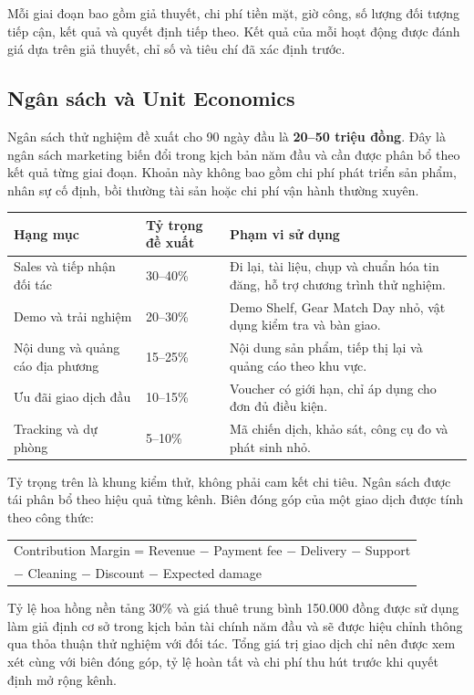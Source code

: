 Mỗi giai đoạn bao gồm giả thuyết, chi phí tiền mặt, giờ công, số lượng đối tượng tiếp cận, kết quả và quyết định tiếp theo. Kết quả của mỗi hoạt động được đánh giá dựa trên giả thuyết, chỉ số và tiêu chí đã xác định trước.

\subsection{Ngân sách và Unit Economics}

Ngân sách thử nghiệm đề xuất cho 90 ngày đầu là \textbf{20--50 triệu đồng}. Đây là ngân sách marketing biến đổi trong kịch bản năm đầu và cần được phân bổ theo kết quả từng giai đoạn. Khoản này không bao gồm chi phí phát triển sản phẩm, nhân sự cố định, bồi thường tài sản hoặc chi phí vận hành thường xuyên.

\begin{longtable}{@{}p{}p{}p{}@{}}
\toprule
\textbf{Hạng mục} & \textbf{Tỷ trọng đề xuất} & \textbf{Phạm vi sử dụng} \\
\midrule
\endhead
Sales và tiếp nhận đối tác & 30--40\% & Đi lại, tài liệu, chụp và chuẩn hóa tin đăng, hỗ trợ chương trình thử nghiệm. \\
Demo và trải nghiệm & 20--30\% & Demo Shelf, Gear Match Day nhỏ, vật dụng kiểm tra và bàn giao. \\
Nội dung và quảng cáo địa phương & 15--25\% & Nội dung sản phẩm, tiếp thị lại và quảng cáo theo khu vực. \\
Ưu đãi giao dịch đầu & 10--15\% & Voucher có giới hạn, chỉ áp dụng cho đơn đủ điều kiện. \\
Tracking và dự phòng & 5--10\% & Mã chiến dịch, khảo sát, công cụ đo và phát sinh nhỏ. \\
\bottomrule
\end{longtable}

Tỷ trọng trên là khung kiểm thử, không phải cam kết chi tiêu. Ngân sách được tái phân bổ theo hiệu quả từng kênh. Biên đóng góp của một giao dịch được tính theo công thức:

\begin{center}
\small
\begin{tabular}{l}
Contribution Margin = Revenue $-$ Payment fee $-$ Delivery $-$ Support \\
$-$ Cleaning $-$ Discount $-$ Expected damage
\end{tabular}
\end{center}

Tỷ lệ hoa hồng nền tảng 30\% và giá thuê trung bình 150.000 đồng được sử dụng làm giả định cơ sở trong kịch bản tài chính năm đầu và sẽ được hiệu chỉnh thông qua thỏa thuận thử nghiệm với đối tác. Tổng giá trị giao dịch chỉ nên được xem xét cùng với biên đóng góp, tỷ lệ hoàn tất và chi phí thu hút trước khi quyết định mở rộng kênh.

